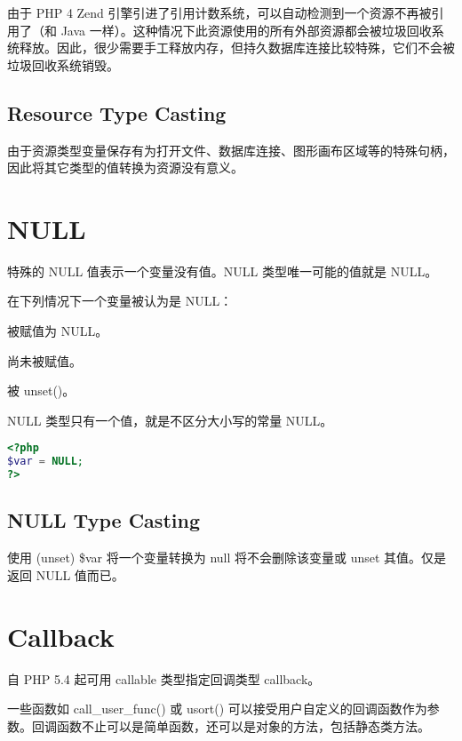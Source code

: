 由于 PHP 4 Zend 引擎引进了引用计数系统，可以自动检测到一个资源不再被引用了（和 Java 一样）。这种情况下此资源使用的所有外部资源都会被垃圾回收系统释放。因此，很少需要手工释放内存，但持久数据库连接比较特殊，它们不会被垃圾回收系统销毁。


\subsection{Resource Type Casting}

由于资源类型变量保存有为打开文件、数据库连接、图形画布区域等的特殊句柄，因此将其它类型的值转换为资源没有意义。




\section{NULL}

特殊的 NULL 值表示一个变量没有值。NULL 类型唯一可能的值就是 NULL。

在下列情况下一个变量被认为是 NULL：

\begin{compactitem}
\item 被赋值为 NULL。
\item 尚未被赋值。
\item 被 unset()。
\end{compactitem}

NULL 类型只有一个值，就是不区分大小写的常量 NULL。

\begin{lstlisting}[language=PHP]
<?php
$var = NULL;       
?>
\end{lstlisting}

\subsection{NULL Type Casting}

使用 (unset) \$var 将一个变量转换为 null 将不会删除该变量或 unset 其值。仅是返回 NULL 值而已。






\section{Callback}

自 PHP 5.4 起可用 callable 类型指定回调类型 callback。


一些函数如 call\_user\_func() 或 usort() 可以接受用户自定义的回调函数作为参数。回调函数不止可以是简单函数，还可以是对象的方法，包括静态类方法。


